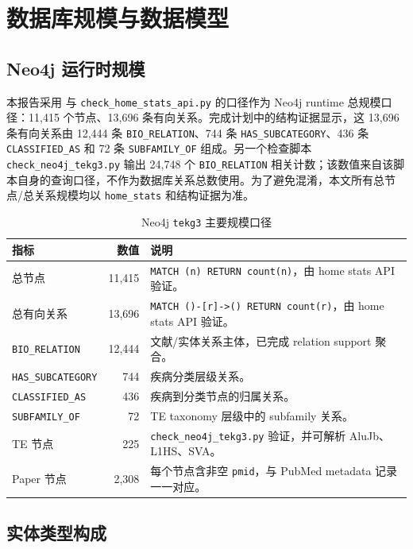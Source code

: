\documentclass[12pt,a4paper,UTF8]{ctexart}
\newcommand{\code}[1]{\texttt{#1}}
\newcommand{\sourcefile}[1]{\path{#1}}
\begin{document}
\section{数据库规模与数据模型}

\subsection{Neo4j 运行时规模}

本报告采用 \sourcefile{api/home_stats.php} 与 \code{check\_home\_stats\_api.py} 的口径作为 Neo4j runtime 总规模口径：11,415 个节点、13,696 条有向关系。完成计划中的结构证据显示，这 13,696 条有向关系由 12,444 条 \code{BIO\_RELATION}、744 条 \code{HAS\_SUBCATEGORY}、436 条 \code{CLASSIFIED\_AS} 和 72 条 \code{SUBFAMILY\_OF} 组成。另一个检查脚本 \code{check\_neo4j\_tekg3.py} 输出 24,748 个 \code{BIO\_RELATION} 相关计数；该数值来自该脚本自身的查询口径，不作为数据库关系总数使用。为了避免混淆，本文所有总节点/总关系规模均以 \code{home\_stats} 和结构证据为准。

\begin{table}[H]
  \centering
  \caption{Neo4j \code{tekg3} 主要规模口径}
  \begin{tabularx}{\textwidth}{l r Y}
    \toprule
    指标 & 数值 & 说明 \\
    \midrule
    总节点 & 11,415 & \code{MATCH (n) RETURN count(n)}，由 home stats API 验证。 \\
    总有向关系 & 13,696 & \code{MATCH ()-[r]->() RETURN count(r)}，由 home stats API 验证。 \\
    \code{BIO\_RELATION} & 12,444 & 文献/实体关系主体，已完成 relation support 聚合。 \\
    \code{HAS\_SUBCATEGORY} & 744 & 疾病分类层级关系。 \\
    \code{CLASSIFIED\_AS} & 436 & 疾病到分类节点的归属关系。 \\
    \code{SUBFAMILY\_OF} & 72 & TE taxonomy 层级中的 subfamily 关系。 \\
    TE 节点 & 225 & \code{check\_neo4j\_tekg3.py} 验证，并可解析 AluJb、L1HS、SVA。 \\
    Paper 节点 & 2,308 & 每个节点含非空 \code{pmid}，与 PubMed metadata 记录一一对应。 \\
    \bottomrule
  \end{tabularx}
\end{table}

\subsection{实体类型构成}
\end{document}
